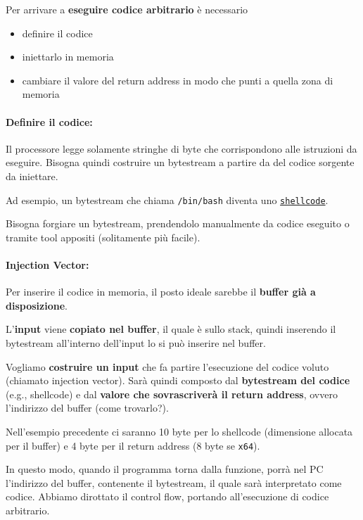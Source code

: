 Per arrivare a \textbf{eseguire codice arbitrario} è necessario
\begin{itemize}
	\item definire il codice

	\item iniettarlo in memoria

	\item cambiare il valore del return address in modo che punti a quella zona di memoria
\end{itemize}

\paragraph{Definire il codice:} Il processore legge solamente stringhe di byte che corrispondono alle istruzioni da eseguire. Bisogna quindi costruire un bytestream a partire da del codice sorgente da iniettare. 

Ad esempio, un bytestream che chiama \texttt{/bin/bash} diventa uno \href{https://it.wikipedia.org/wiki/Shellcode}{\texttt{shellcode}}.

Bisogna forgiare un bytestream, prendendolo manualmente da codice eseguito o tramite tool appositi (solitamente più facile).

\paragraph{Injection Vector:} Per inserire il codice in memoria, il posto ideale sarebbe il \textbf{buffer già a disposizione}. 

L'\textbf{input} viene \textbf{copiato nel buffer}, il quale è sullo stack, quindi inserendo il bytestream all'interno dell'input lo si può inserire nel buffer.

Vogliamo \textbf{costruire un input} che fa partire l'esecuzione del codice voluto (chiamato injection vector). Sarà quindi composto dal \textbf{bytestream del codice} (e.g., shellcode) e dal \textbf{valore che sovrascriverà il return address}, ovvero l'indirizzo del buffer (come trovarlo?).

Nell'esempio precedente ci saranno 10 byte per lo shellcode (dimensione allocata per il buffer) e 4 byte per il return address (8 byte se \texttt{x64}).

In questo modo, quando il programma torna dalla funzione, porrà nel PC l'indirizzo del buffer, contenente il bytestream, il quale sarà interpretato come codice. Abbiamo dirottato il control flow, portando all'esecuzione di codice arbitrario.

